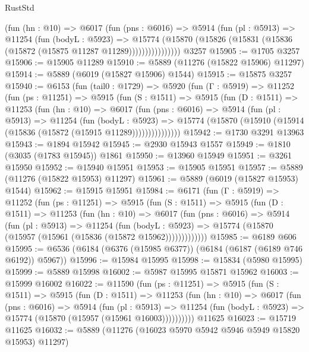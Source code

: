 \begin{lexlean}{RustStd}
\begin{coremodule}
                (fun (hn : @10) =>
                @6017
                  (fun (pns : @6016) =>
                  @5914
                    (fun (pl : @5913) =>
                    @11254
                      (fun (bodyL : @5923) =>
                      @15774
                        (@15870
                          (@15826 (@15831 (@15836 (@15872 (@15875 @11287 @11289))))))))))))))))
    @3257
@15905 := @1705 @3257
@15906 := @15905 @11289
@15910 := @5889 (@11276 (@15822 @15906) @11297)
@15914 := @5889 (@6019 (@15827 @15906) @1544)
@15915 := @15875 @3257
@15940 := @6153
    (fun (tail0 : @1729) =>
    @5920
      (fun (Γ : @5919) =>
      @11252
        (fun (ps : @11251) =>
        @5915
          (fun (S : @1511) =>
          @5915
            (fun (D : @1511) =>
            @11253
              (fun (hn : @10) =>
              @6017
                (fun (pns : @6016) =>
                @5914
                  (fun (pl : @5913) =>
                  @11254
                    (fun (bodyL : @5923) =>
                    @15774 (@15870 (@15910 (@15914 (@15836 (@15872 (@15915 @11289)))))))))))))))
@15942 := @1730 @3291 @13963
@15943 := @1894 @15942
@15945 := @2930 @15943 @1557
@15949 := @1810 (@3035 (@1783 @15945)) @1861
@15950 := @13960 @15949
@15951 := @3261 @15950
@15952 := @15940 @15951
@15953 := @15905 @15951
@15957 := @5889 (@11276 (@15822 @15953) @11297)
@15961 := @5889 (@6019 (@15827 @15953) @1544)
@15962 := @15915 @15951
@15984 := @6171
    (fun (Γ : @5919) =>
    @11252
      (fun (ps : @11251) =>
      @5915
        (fun (S : @1511) =>
        @5915
          (fun (D : @1511) =>
          @11253
            (fun (hn : @10) =>
            @6017
              (fun (pns : @6016) =>
              @5914
                (fun (pl : @5913) =>
                @11254
                  (fun (bodyL : @5923) =>
                  @15774 (@15870 (@15957 (@15961 (@15836 (@15872 @15962)))))))))))))
@15985 := @6189 @606
@15995 := @6536 (@6184 (@6376 (@15985 @6377)) (@6184 (@6187 (@6189 @746 @6192)) @5967))
@15996 := @15984 @15995
@15998 := @15834 (@5980 @15995)
@15999 := @5889 @15998
@16002 := @5987 @15995 @15871 @15962
@16003 := @15999 @16002
@16022 := @11590
    (fun (ps : @11251) =>
    @5915
      (fun (S : @1511) =>
      @5915
        (fun (D : @1511) =>
        @11253
          (fun (hn : @10) =>
          @6017
            (fun (pns : @6016) =>
            @5914
              (fun (pl : @5913) =>
              @11254 (fun (bodyL : @5923) => @15774 (@15870 (@15957 (@15961 @16003))))))))))
    @11625
@16023 := @15719 @11625
@16032 := @5889 (@11276 (@16023 @5970 @5942 @5946 @5949 @15820 @15953) @11297)

\end{coremodule}
\end{lexlean}
